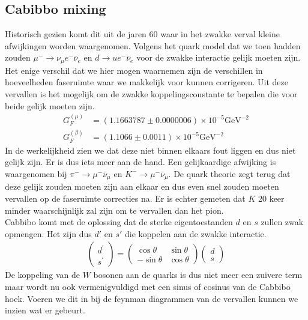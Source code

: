 \documentclass[../main.tex]{subfiles}
\begin{document}
\subsection{Cabibbo mixing}%
\label{sub:cabibbo_mixing}

Historisch gezien komt dit uit de jaren 60 waar in het zwakke verval kleine afwijkingen worden waargenomen. Volgens het quark model dat we toen hadden zouden $\mu^{-} \rightarrow \nu_{\mu} e^{-} \bar{\nu}_{e}$ en $d \rightarrow u e^{-} \bar{\nu}_{e}$ voor de zwakke interactie gelijk moeten zijn. Het enige verschil dat we hier mogen waarnemen zijn de verschillen in hoeveelheden faseruimte waar we makkelijk voor kunnen corrigeren. Uit deze vervallen is het mogelijk om de zwakke koppelingsconstante te bepalen die voor beide gelijk moeten zijn.
\begin{equation}
    \begin{aligned}
        \label{eq:afwijking_zwak_verval}
        G_{F}^{(\mu)}&=(1.1663787 \pm 0.0000006) \times 10^{-5} \text{GeV}^{-2} \\
        G_{F}^{(\beta)}&=(1.1066 \pm 0.0011) \times 10^{-5} \text{GeV}^{-2}
    \end{aligned}
\end{equation}
In de werkelijkheid zien we dat deze niet binnen elkaars fout liggen en dus niet gelijk zijn. Er is dus iets meer aan de hand. Een gelijkaardige afwijking is waargenomen bij $\pi^{-} \rightarrow \mu^{-} \bar{\nu}_{\mu}$ en $K^{-} \rightarrow \mu^{-} \bar{\nu}_{\mu}$. De quark theorie zegt terug dat deze gelijk zouden moeten zijn aan elkaar en dus even snel zouden moeten vervallen op de faseruimte correcties na. Er is echter gemeten dat $K$ 20 keer minder waarschijnlijk zal zijn om te vervallen dan het pion.\\
Cabbibo komt met de oplossing dat de sterke eigentoestanden $d$ en $s$ zullen zwak opmengen. Het zijn dus $d'$ en $s'$ die koppelen aan de zwakke interactie.
\begin{equation}
    \begin{aligned}
        \label{eq:cabb_opmenging}
        \left(\begin{array}{c}
                d^{\prime} \\
                s^{\prime}
                \end{array}\right)=\left(\begin{array}{cc}
                \cos \theta & \sin \theta \\
                -\sin \theta & \cos \theta
                \end{array}\right)\left(\begin{array}{l}
                d \\
                s
        \end{array}\right)
    \end{aligned}
\end{equation}
De koppeling van de $W$ bosonen aan de quarks is dus niet meer een zuivere term maar wordt nu ook vermenigvuldigd met een sinus of cosinus van de Cabbibo hoek. Voeren we dit in bij de feynman diagrammen van de vervallen kunnen we inzien wat er gebeurt.
\end{document}
